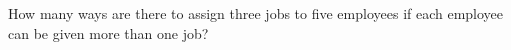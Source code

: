 \documentclass[../main.tex]{subfiles}
\begin{document}
How many ways are there to assign three jobs to five employees if each employee can be given more than one job?

\solution
\end{document}
